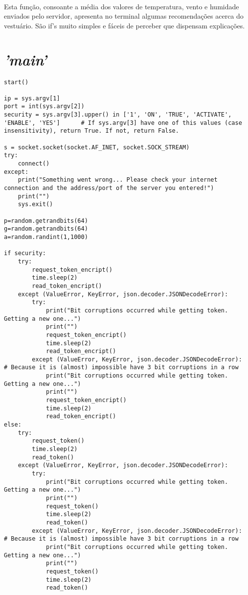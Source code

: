 \documentclass[a4paper]{report}
\begin{document}
\paragraph{}Esta função, consoante a média dos valores de temperatura, vento e humidade enviados pelo servidor, apresenta no terminal algumas recomendações acerca do vestuário. São if's muito simples e fáceis de perceber que dispensam explicações.

\newpage

\section{\textit{'main'}}
\label{sec.main}
\begin{lstlisting}
start()

ip = sys.argv[1]
port = int(sys.argv[2])
security = sys.argv[3].upper() in ['1', 'ON', 'TRUE', 'ACTIVATE', 'ENABLE', 'YES']		# If sys.argv[3] have one of this values (case insensitivity), return True. If not, return False.

s = socket.socket(socket.AF_INET, socket.SOCK_STREAM)
try:
	connect()
except:
	print("Something went wrong... Please check your internet connection and the address/port of the server you entered!")
	print("")
	sys.exit()

p=random.getrandbits(64)
g=random.getrandbits(64)
a=random.randint(1,1000)

if security:
	try:
		request_token_encript()
		time.sleep(2)
		read_token_encript()
	except (ValueError, KeyError, json.decoder.JSONDecodeError):
		try:
			print("Bit corruptions occurred while getting token. Getting a new one...")
			print("")
			request_token_encript()
			time.sleep(2)
			read_token_encript()
		except (ValueError, KeyError, json.decoder.JSONDecodeError):	# Because it is (almost) impossible have 3 bit corruptions in a row
			print("Bit corruptions occurred while getting token. Getting a new one...")
			print("")
			request_token_encript()
			time.sleep(2)
			read_token_encript()
else:
	try:
		request_token()
		time.sleep(2)
		read_token()
	except (ValueError, KeyError, json.decoder.JSONDecodeError):
		try:
			print("Bit corruptions occurred while getting token. Getting a new one...")
			print("")
			request_token()
			time.sleep(2)
			read_token()
		except (ValueError, KeyError, json.decoder.JSONDecodeError):	# Because it is (almost) impossible have 3 bit corruptions in a row
			print("Bit corruptions occurred while getting token. Getting a new one...")
			print("")
			request_token()
			time.sleep(2)
			read_token()


\end{lstlisting}
\end{document}

